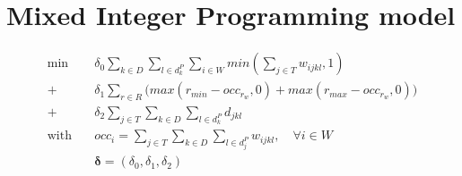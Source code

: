 \documentclass[../../thesis.tex]{subfiles}
\begin{document}
\chapter{Mixed Integer Programming model}

\begingroup
\allowdisplaybreaks
\begin{subequations}
  \begin{align*}
    \textrm{min} \quad & \delta_0 \sum_{k \in D} \sum_{l \in d^P_k} \sum_{i \in W} min(\sum_{j \in T} w_{ijkl}, 1)  \\ 
      + \ & \delta_1 \sum_{r \in R} \big( max(r_{min} - occ_{r_{w}}, 0) + max(r_{max} - occ_{r_{w}}, 0) \big)   \\ 
      + \ &\delta_2 \sum_{j \in T}\sum_{k\in D}\sum_{l \in d^P_k} d_{jkl}  \\ 
     \textrm{with} \quad & occ_i = \sum_{j \in T} \sum_{k \in D} \sum_{l \in d^P_j} w_{ijkl}, \quad \forall i \in W  \nonumber \\ 
                         & \bm{\delta} = (\delta_0, \delta_1, \delta_2) \nonumber
  \end{align*}
\end{subequations}
\end{document}
